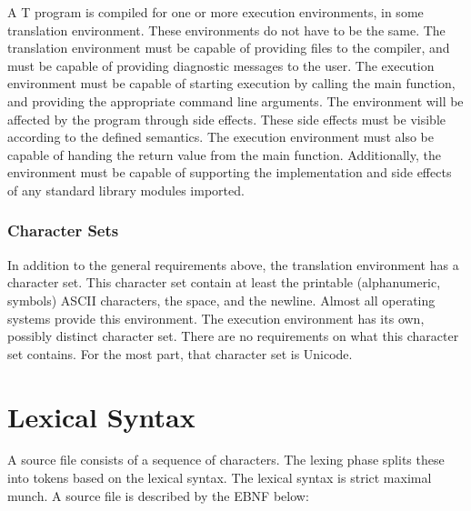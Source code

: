 \documentclass[letterpaper,12pt]{book}
\begin{document}
A T program is compiled for one or more execution environments, in some translation environment. These environments do not have to be the same. The translation environment must be capable of providing files to the compiler, and must be capable of providing diagnostic messages to the user. The execution environment must be capable of starting execution by calling the main function, and providing the appropriate command line arguments. The environment will be affected by the program through side effects. These side effects must be visible according to the defined semantics. The execution environment must also be capable of handing the return value from the main function. Additionally, the environment must be capable of supporting the implementation and side effects of any standard library modules imported.

\subsection{Character Sets}

In addition to the general requirements above, the translation environment has a character set. This character set contain at least the printable (alphanumeric, symbols) ASCII characters, the space, and the newline. Almost all operating systems provide this environment. The execution environment has its own, possibly distinct character set. There are no requirements on what this character set contains. For the most part, that character set is Unicode.

\chapter{Lexical Syntax}

A source file consists of a sequence of characters. The lexing phase splits these into tokens based on the lexical syntax. The lexical syntax is strict maximal munch. A source file is described by the EBNF below:
\end{document}
